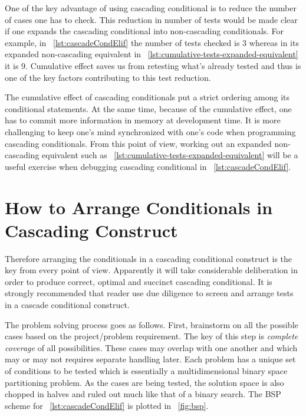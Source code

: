 One of the key advantage of using cascading conditional is to reduce the number of cases one has
to check.
This reduction in number of tests would be made clear if one expands the cascading conditional
into non-cascading conditionals.
For example, in ~\autoref{lst:cascadeCondElif} the number of tests checked is $3$
whereas in its expanded non-cascading equivalent in
~\autoref{lst:cumulative-tests-expanded-equivalent} it is $9$.
Cumulative effect saves us from retesting what's already tested and thus is one of the key factors
contributing to this test reduction.


The cumulative effect of cascading conditionals put a strict ordering among
its conditional statements.
At the same time, because of the cumulative effect, one has to commit more information in memory
at development time.
It is more challenging to keep one's mind synchronized with one's code
when programming cascading conditionals.
From this point of view, working out an expanded non-cascading equivalent such as
~\autoref{lst:cumulative-tests-expanded-equivalent} will be a useful exercise
when debugging cascading conditional in ~\autoref{lst:cascadeCondElif}.


\section{How to Arrange Conditionals in Cascading Construct}
\label{sec:orderingstaircaseconditional}

Therefore arranging the conditionals in a cascading conditional construct is the key
from every point of view.
Apparently it will take considerable deliberation in order to produce correct, optimal and succinct
cascading conditional.
It is strongly recommended that reader use due diligence to screen and arrange tests in a cascade
conditional construct.


The problem solving process goes as follows.
First, brainstorm on all the possible cases based on the project/problem requirement.
The key of this step is \emph{complete coverage} of all possibilities.
These cases may overlap with one another and which may or may not requires separate handling later.
Each problem has a unique set of conditions to be tested
which is essentially a multidimensional binary space partitioning problem\cite{NAYLOR90,NAYLOR93}.
As the cases are being tested, the solution space is also chopped in halves and
ruled out much like that of a binary search.
The BSP scheme for ~\autoref{lst:cascadeCondElif} is plotted in ~\autoref{fig:bsp}.

